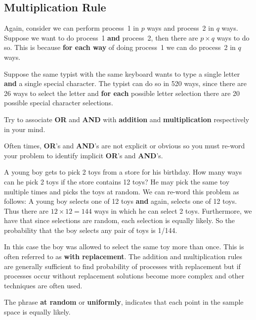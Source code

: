 \subsection*{Multiplication Rule}
Again, consider we can perform process~1 in $p$ ways and process~2 in $q$ ways. Suppose we want to do process~1 \textbf{and} process~2, then there are $p \times q$ ways to do so. This is because \textbf{for each way} of doing process~1 we can do process~2 in $q$ ways.
\begin{example}
Suppose the same typist with the same keyboard wants to type a single letter \textbf{and} a single special character. The typist can do so in 520 ways, since there are 26 ways to select the letter and \textbf{for each} possible letter selection there are 20 possible special character selections.
\end{example}
\begin{info}
Try to associate \textbf{OR} and \textbf{AND} with \textbf{addition} and \textbf{multiplication} respectively in your mind.
\end{info}
\begin{info}
 Often times, \textbf{OR}'s and \textbf{AND}'s are not explicit or obvious so you must re-word your problem to identify implicit \textbf{OR}'s and \textbf{AND}'s.
\end{info}
\begin{example}
A young boy gets to pick 2 toys from a store for his birthday. How many ways can he pick 2 toys if the store contains 12 toys? He may pick the same toy multiple times and picks the toys at random.
\tcblower
We can re-word this problem as follows: A young boy selects one of 12 toys \textbf{and} again, selects one of 12 toys. Thus there are $12 \times 12 = 144$ ways in which he can select 2 toys. Furthermore, we have that since selections are random, each selection is equally likely. So the probability that the boy selects any pair of toys is 1/144.
\end{example}
\begin{info}
In this case the boy was allowed to select the same toy more than once. This is often referred to as \textbf{with replacement}. The addition and multiplication rules are generally sufficient to find probability of processes with replacement but if processes occur without replacement solutions become more complex and other techniques are often used.
\end{info}
\begin{info}
The phrase \textbf{at random} or \textbf{uniformly}, indicates that each point in the sample space is equally likely.
\end{info}